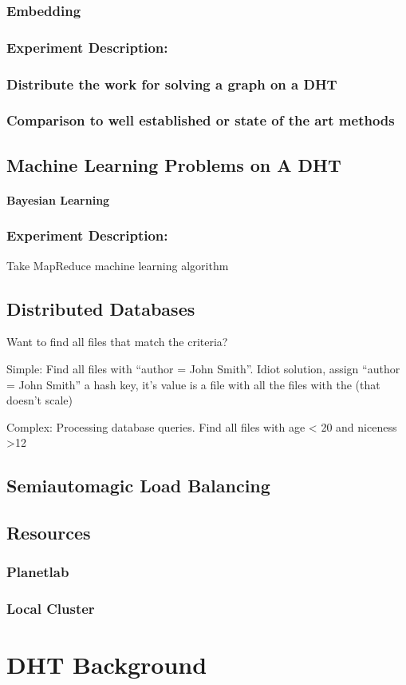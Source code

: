\documentclass[10pt,letterpaper]{report}
\begin{document}
\subsection{Embedding}

\subsection{Experiment Description:}
\subsection{Distribute the work for solving a graph on a DHT}
\subsection{Comparison to well established or state of the art methods}



\section{Machine Learning Problems on A DHT}


\subsubsection{Bayesian Learning}
\subsection{Experiment Description:}
Take MapReduce machine learning algorithm

\section{Distributed Databases}


Want to find all files that match the criteria?

Simple: Find all files with ``author = John Smith''.  Idiot solution, assign ``author = John Smith'' a hash key,  it's value is a file with all the files with the (that doesn't scale) 


Complex: Processing database queries.   Find all files with age < 20 and niceness >12


\section{Semiautomagic Load Balancing}

\section{Resources}
\subsection{Planetlab}
\subsection{Local Cluster}

\chapter{DHT Background}





\end{document}

